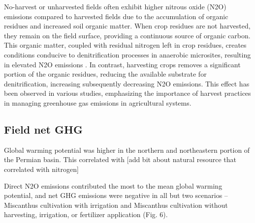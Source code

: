 \documentclass[11pt]{article}
\begin{document}
No-harvest or unharvested fields often exhibit higher nitrous oxide (N2O) emissions compared to harvested fields due to the accumulation of organic residues and increased soil organic matter. When crop residues are not harvested, they remain on the field surface, providing a continuous source of organic carbon. This organic matter, coupled with residual nitrogen left in crop residues, creates conditions conducive to denitrification processes in anaerobic microsites, resulting in elevated N2O emissions \citep{Smith2008GHGMitigation}. In contrast, harvesting crops removes a significant portion of the organic residues, reducing the available substrate for denitrification, increasing subsequently decreasing N2O emissions. This effect has been observed in various studies, emphasizing the importance of harvest practices in managing greenhouse gas emissions in agricultural systems.

\subsection*{Field net GHG}

Global warming potential was higher in the northern and northeastern portion of the Permian basin. This correlated with [add bit about natural resource that correlated with nitrogen]


Direct N2O emissions contributed the most to the mean global warming potential, and net GHG emissions were negative in all but two scenarios – Miscanthus cultivation with irrigation and Miscanthus cultivation without harvesting, irrigation, or fertilizer application (Fig. 6). 
\end{document}
